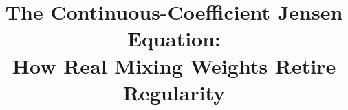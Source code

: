 \documentclass{article}
\theoremstyle{plain}
\theoremstyle{definition}
\begin{document}


\title{The Continuous-Coefficient Jensen Equation:\\
       How Real Mixing Weights Retire Regularity}


\author{}

\maketitle
\end{document}
